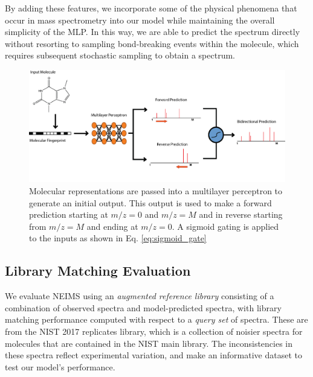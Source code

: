 By adding these features, we incorporate some of the physical phenomena that occur in mass spectrometry into our model while maintaining the overall simplicity of the MLP. In this way, we are able to predict the spectrum directly without resorting to sampling bond-breaking events within the molecule, which requires subsequent stochastic sampling to obtain a spectrum.


\begin{figure}[t]
    \centering
    \includegraphics[width=0.9\linewidth]{./Model_prediction.png}
    \caption[Neural Electron Ionization MS Prediction Model]{Molecular representations are passed into a multilayer perceptron to generate an initial output. This output is used to make a forward prediction starting at $\textit{m/z}=0$ and $\textit{m/z}=M$ and in reverse starting from $\textit{m/z}=M$ and ending at $\textit{m/z}=0$. A sigmoid gating is applied to the inputs as shown in Eq. \ref{eq:sigmoid_gate}}
    \label{fig:model_prediction}
\end{figure}


\subsection{Library Matching Evaluation}\label{sec:library_matching_description}

We evaluate NEIMS using an \textit{augmented reference library} consisting of a combination of observed spectra and model-predicted spectra, with library matching performance computed with respect to a \textit{query set} of spectra. These are from the NIST 2017 replicates library, which is a collection of noisier spectra for molecules that are contained in the NIST main library. The inconsistencies in these spectra reflect experimental variation, and make an informative dataset to test our model's performance.

